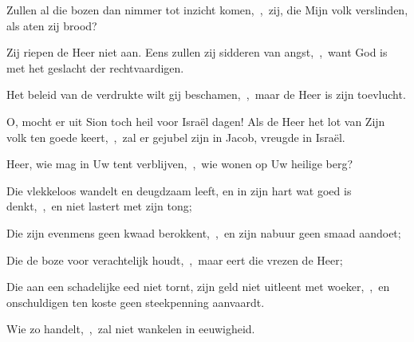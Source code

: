 \documentclass[12pt,twoside,a5paper]{article}
\begin{document}

\begin{halfparskip}
  Zullen al die bozen dan nimmer tot inzicht komen,~\sep\ zij, die Mijn volk verslinden, als aten zij brood?

  Zij riepen de Heer niet aan. Eens zullen zij sidderen van angst,~\sep\ want God is met het geslacht der rechtvaardigen.

  Het beleid van de verdrukte wilt gij beschamen,~\sep\ maar de Heer is zijn toevlucht.

  O, mocht er uit Sion toch heil voor Israël dagen! Als de Heer het lot van Zijn volk ten goede keert,~\sep\ zal er gejubel zijn in Jacob, vreugde in Israël.
\end{halfparskip}




\begin{halfparskip}
  Heer, wie mag in Uw tent verblijven,~\sep\ wie wonen op Uw heilige berg?


  Die vlekkeloos wandelt en deugdzaam leeft, en in zijn hart wat goed is denkt,~\sep\ en niet lastert met zijn tong;

  Die zijn evenmens geen kwaad berokkent,~\sep\ en zijn nabuur geen smaad aandoet;

  Die de boze voor verachtelijk houdt,~\sep\ maar eert die vrezen de Heer;

  Die aan een schadelijke eed niet tornt, zijn geld niet uitleent met woeker,~\sep\ en onschuldigen ten koste geen steekpenning aanvaardt.

  Wie zo handelt,~\sep\ zal niet wankelen in eeuwigheid.
\end{halfparskip}


\end{document}
